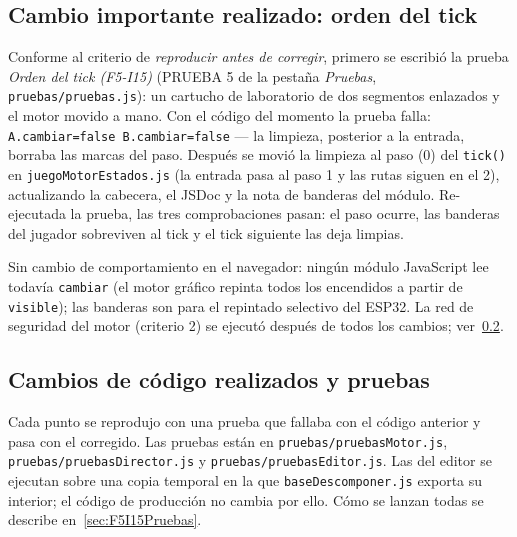 \subsection{Cambio importante realizado: orden del tick}
\label{sec:F5I15OrdenTick}

Conforme al criterio de \emph{reproducir antes de corregir}, primero se escribió la prueba \emph{Orden del tick (F5-I15)} (PRUEBA 5 de la pestaña \emph{Pruebas}, \texttt{pruebas/pruebas.js}): un cartucho de laboratorio de dos segmentos enlazados y el motor movido a mano. Con el código del momento la prueba falla: \texttt{A.cambiar=false B.cambiar=false} — la limpieza, posterior a la entrada, borraba las marcas del paso. Después se movió la limpieza al paso (0) del \texttt{tick()} en \texttt{juegoMotorEstados.js} (la entrada pasa al paso 1 y las rutas siguen en el 2), actualizando la cabecera, el JSDoc y la nota de banderas del módulo. Re-ejecutada la prueba, las tres comprobaciones pasan: el paso ocurre, las banderas del jugador sobreviven al tick y el tick siguiente las deja limpias.

Sin cambio de comportamiento en el navegador: ningún módulo JavaScript lee todavía \texttt{cambiar} (el motor gráfico repinta todos los encendidos a partir de \texttt{visible}); las banderas son para el repintado selectivo del ESP32. La red de seguridad del motor (criterio 2) se ejecutó después de todos los cambios; ver~\ref{sec:F5I15Cambios}.

\subsection{Cambios de código realizados y pruebas}
\label{sec:F5I15Cambios}

Cada punto se reprodujo con una prueba que fallaba con el código anterior y pasa con el corregido. Las pruebas están en \texttt{pruebas/pruebasMotor.js}, \texttt{pruebas/pruebasDirector.js} y \texttt{pruebas/pruebasEditor.js}. Las del editor se ejecutan sobre una copia temporal en la que \texttt{baseDescomponer.js} exporta su interior; el código de producción no cambia por ello. Cómo se lanzan todas se describe en~\ref{sec:F5I15Pruebas}.

